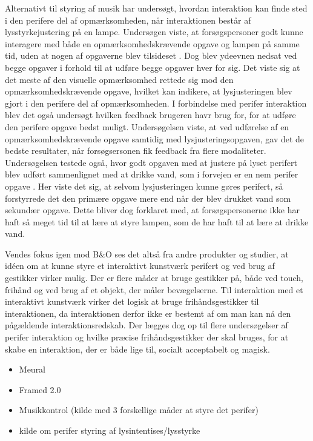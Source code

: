  Alternativt til styring af musik har \textcite[s. 1]{PDF:FacilitatingPIDesignAndEvaluation} undersøgt, hvordan interaktion kan finde sted i den perifere del af opmærksomheden, når interaktionen består af lysstyrkejustering på en lampe. Undersøgen viste, at forsøgspersoner godt kunne interagere med både en opmærksomhedskrævende opgave og lampen på samme tid, uden at nogen af opgaverne blev tilsideset \parencite[ss. 20-21]{PDF:FacilitatingPIDesignAndEvaluation}. Dog blev ydeevnen nedsat ved begge opgaver i forhold til at udføre begge opgaver hver for sig. Det viste sig at det meste af den visuelle opmærksomhed rettede sig mod den opmærksomhedskrævende opgave, hvilket kan indikere, at lysjusteringen blev gjort i den perifere del af opmærksomheden. I forbindelse med perifer interaktion blev det også undersøgt hvilken feedback brugeren havr brug for, for at udføre den perifere opgave bedst muligt. Undersøgelsen viste, at ved udførelse af en opmærksomhedskrævende opgave samtidig med lysjusteringsopgaven, gav det de bedste resultater, når forsøgsersonen fik feedback fra flere modaliteter.  Undersøgelsen testede også, hvor godt opgaven med at justere på lyset perifert blev udført sammenlignet med at drikke vand, som i forvejen er en nem perifer opgave \parencite[s. 20]{PDF:FacilitatingPIDesignAndEvaluation}. Her viste det sig, at selvom lysjusteringen kunne gøres perifert, så forstyrrede det den primære opgave mere end når der blev drukket vand som sekundær opgave. Dette bliver dog forklaret med, at forsøgspersonerne ikke har haft så meget tid til at lære at styre lampen, som de har haft til at lære at drikke vand. 
 
Vendes fokus igen mod B$\&$O ses det altså fra andre produkter og studier, at idéen om at kunne styre et interaktivt kunstværk perifert og ved brug af gestikker virker mulig. Der er flere måder at bruge gestikker på, både ved touch, frihånd og ved brug af et objekt, der måler bevægelserne. Til interaktion med et interaktivt kunstværk virker det logisk at bruge frihåndsgestikker til interaktionen, da interaktionen derfor ikke er bestemt af om man kan nå den pågældende interaktionsredskab. Der lægges dog op til flere undersøgelser af perifer interaktion og hvilke præcise frihåndsgestikker der skal bruges, for at skabe en interaktion, der er både lige til, socialt acceptabelt og magisk.
 
  
 
 


%
\begin{itemize}
  \item Meural \parencite{WEB:Meural}
  \item Framed 2.0 
  \item Musikkontrol (kilde med 3 forskellige måder at styre det perifer)
  \item kilde om perifer styring af lysintentises/lysstyrke
\end{itemize}
